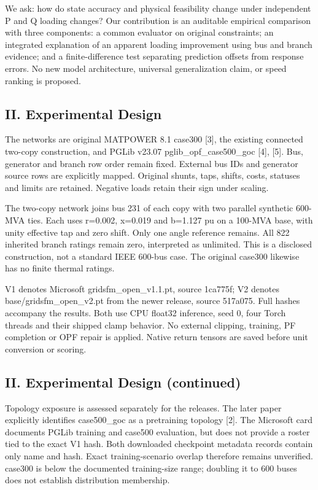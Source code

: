 \documentclass[conference]{IEEEtran}
\begin{document}
We ask: how do state accuracy and physical feasibility change under independent P and Q loading changes? Our contribution is an auditable empirical comparison with three components: a common evaluator on original constraints; an integrated explanation of an apparent loading improvement using bus and branch evidence; and a finite-difference test separating prediction offsets from response errors. No new model architecture, universal generalization claim, or speed ranking is proposed.

\subsection*{II. Experimental Design}
The networks are original MATPOWER 8.1 case300 [3], the existing connected two-copy construction, and PGLib v23.07 pglib\_opf\_case500\_goc [4], [5]. Bus, generator and branch row order remain fixed. External bus IDs and generator source rows are explicitly mapped. Original shunts, taps, shifts, costs, statuses and limits are retained. Negative loads retain their sign under scaling.

The two-copy network joins bus 231 of each copy with two parallel synthetic 600-MVA ties. Each uses r=0.002, x=0.019 and b=1.127 pu on a 100-MVA base, with unity effective tap and zero shift. Only one angle reference remains. All 822 inherited branch ratings remain zero, interpreted as unlimited. This is a disclosed construction, not a standard IEEE 600-bus case. The original case300 likewise has no finite thermal ratings.

V1 denotes Microsoft gridsfm\_open\_v1.1.pt, source 1ca775f; V2 denotes base/gridsfm\_open\_v2.pt from the newer release, source 517a075. Full hashes accompany the results. Both use CPU float32 inference, seed 0, four Torch threads and their shipped clamp behavior. No external clipping, training, PF completion or OPF repair is applied. Native return tensors are saved before unit conversion or scoring.

\subsection*{II. Experimental Design (continued)}
Topology exposure is assessed separately for the releases. The later paper explicitly identifies case500\_goc as a pretraining topology [2]. The Microsoft card documents PGLib training and case500 evaluation, but does not provide a roster tied to the exact V1 hash. Both downloaded checkpoint metadata records contain only name and hash. Exact training-scenario overlap therefore remains unverified. case300 is below the documented training-size range; doubling it to 600 buses does not establish distribution membership.
\end{document}
